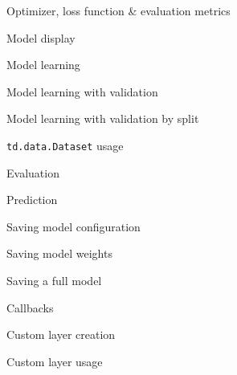 \begin{frame}{Optimizer, loss function \& evaluation metrics}
\end{frame}

\begin{frame}{Model display}
\end{frame}

\begin{frame}{Model learning}
\end{frame}

\begin{frame}{Model learning with validation}
\end{frame}

\begin{frame}{Model learning with validation by split}
\end{frame}

\begin{frame}{\texttt{td.data.Dataset} usage}
\end{frame}

\begin{frame}{Evaluation}
\end{frame}

\begin{frame}{Prediction}
\end{frame}

\begin{frame}{Saving model configuration}
\end{frame}

\begin{frame}{Saving model weights}
\end{frame}

\begin{frame}{Saving a full model}
\end{frame}

\begin{frame}{Callbacks}
\end{frame}

\begin{frame}{Custom layer creation}
\end{frame}

\begin{frame}{Custom layer usage}
\end{frame}
